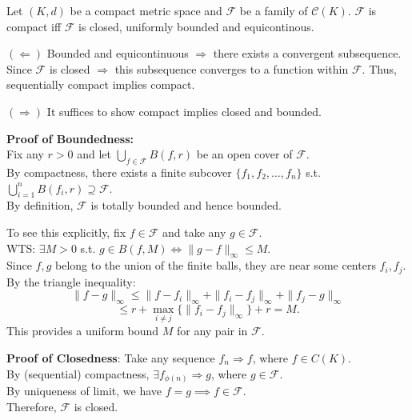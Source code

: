 
\begin{corollary}
    Let $(K,d)$ be a compact metric space and $\mathcal{F}$ be a family of $\mathcal{C}(K)$. 
    $\mathcal{F}$ is compact iff $\mathcal{F}$ is closed, uniformly bounded and equicontinous.
\end{corollary}

\begin{pfbox}
    $(\Leftarrow)$ Bounded and equicontinuous $\Rightarrow$ there exists a convergent subsequence. Since $\mathcal{F}$ is closed $\Rightarrow$ this subsequence converges to a function within $\mathcal{F}$. Thus, sequentially compact implies compact.
    
    $(\Rightarrow)$ It suffices to show compact implies closed and bounded.
    
    \textbf{Proof of Boundedness:} \\
    Fix any $r > 0$ and let $\displaystyle \bigcup_{f \in \mathcal{F}} B(f, r)$ be an open cover of $\mathcal{F}$. \\
    By compactness, there exists a finite subcover $\{f_1, f_2, \dots, f_n\}$ s.t. $\displaystyle \bigcup_{i=1}^n B(f_i, r) \supseteq \mathcal{F}$. \\
    By definition, $\mathcal{F}$ is totally bounded and hence bounded.
    
    To see this explicitly, fix $f \in \mathcal{F}$ and take any $g \in \mathcal{F}$. \\
    WTS: $\exists M > 0$ s.t. $g \in B(f, M) \Leftrightarrow \|g - f\|_\infty \le M$. \\
    Since $f, g$ belong to the union of the finite balls, they are near some centers $f_i, f_j$. By the triangle inequality:
    \[ \|f - g\|_\infty \le \|f - f_i\|_\infty + \|f_i - f_j\|_\infty + \|f_j - g\|_\infty \]
    \[ \le \displaystyle r + \max_{i \neq j}\{\|f_i - f_j\|_\infty\} + r = M. \]
    This provides a uniform bound $M$ for any pair in $\mathcal{F}$.

    \textbf{Proof of Closedness}:
    Take any sequence $f_n \Rightarrow f$, where $f \in C(K)$. \\
    By (sequential) compactness, $\exists f_{\phi(n)} \Rightarrow g$, where $g \in \mathcal{F}$. \\
    By uniqueness of limit, we have $f = g \implies f \in \mathcal{F}$. \\
    Therefore, $\mathcal{F}$ is closed.
\end{pfbox}





